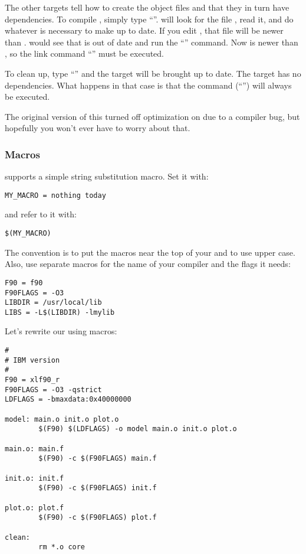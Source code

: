 The other targets tell  how to create the object files
and that they in turn have dependencies.  To compile , simply
type ``''.  will look for the file ,
read it, and do whatever is necessary to make  up
to date. If you edit , that file will be newer than
.  would see that  is out of date
and run the ``'' command. Now 
is newer than , so the link command ``'' must be executed.

To clean up, type ``'' and the  target will
be brought up to date. The  target has no dependencies. What
happens in that case is that the command (``'') will
always be executed.

The original version of this  turned off
optimization on  due to a compiler bug, but hopefully you
won't ever have to worry about that.

\subsubsection{Macros}

 supports a simple string substitution macro. Set it with:
\begin{verbatim}
MY_MACRO = nothing today
\end{verbatim}
and refer to it with:
\begin{verbatim}
$(MY_MACRO)
\end{verbatim}

The convention is to put the macros near the top of your 
and to use upper case. Also, use separate macros for the name of
your compiler and the flags it needs:
\begin{verbatim}
F90 = f90
F90FLAGS = -O3
LIBDIR = /usr/local/lib
LIBS = -L$(LIBDIR) -lmylib
\end{verbatim}

Let's rewrite our  using macros:
\begin{verbatim}
#
# IBM version
#
F90 = xlf90_r
F90FLAGS = -O3 -qstrict
LDFLAGS = -bmaxdata:0x40000000

model: main.o init.o plot.o
        $(F90) $(LDFLAGS) -o model main.o init.o plot.o

main.o: main.f
        $(F90) -c $(F90FLAGS) main.f

init.o: init.f
        $(F90) -c $(F90FLAGS) init.f

plot.o: plot.f
        $(F90) -c $(F90FLAGS) plot.f

clean:
        rm *.o core
\end{verbatim}

